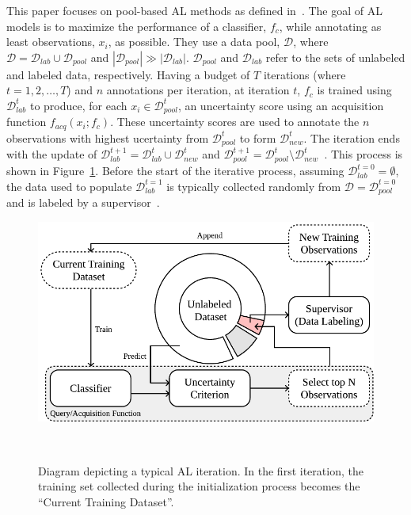 \documentclass[10pt,journal,compsoc]{IEEEtran}
\begin{document}
This paper focuses on pool-based AL methods as defined
in~\cite{katz2021improved}. The goal of AL models is to maximize the
performance of a classifier, $f_{c}$, while annotating as least observations,
$x_i$, as possible. They use a data pool, $\mathcal{D}$, where $\mathcal{D} =
\mathcal{D}_{lab} \cup \mathcal{D}_{pool}$ and $|\mathcal{D}_{pool}| \gg
|\mathcal{D}_{lab}|$. $\mathcal{D}_{pool}$ and $\mathcal{D}_{lab}$ refer to
the sets of unlabeled and labeled data, respectively. Having a budget of $T$
iterations (where $t = 1, 2, \ldots, T$) and $n$ annotations per iteration, at
iteration $t$, $f_c$ is trained using $\mathcal{D}_{lab}^t$ to produce, for
each $x_i \in \mathcal{D}_{pool}^t$, an uncertainty score using an acquisition
function $f_{acq}(x_i;f_c)$. These uncertainty scores are used to annotate the
$n$ observations with highest ucertainty from $\mathcal{D}_{pool}^t$ to form
$\mathcal{D}_{new}^t$. The iteration ends with the update of
$\mathcal{D}_{lab}^{t+1} = \mathcal{D}_{lab}^t \cup \mathcal{D}_{new}^t$ and
$\mathcal{D}_{pool}^{t+1} = \mathcal{D}_{pool}^t \setminus
\mathcal{D}_{new}^t$~\cite{Su2020, Sverchkov2017}. This process is shown in
Figure~\ref{fig:al_iteration}. Before the start of the iterative process,
assuming $\mathcal{D}_{lab}^{t=0} = \emptyset$, the data used to populate
$\mathcal{D}_{lab}^{t=1}$ is typically collected randomly from $\mathcal{D} =
\mathcal{D}_{pool}^{t=0}$ and is labeled by a supervisor~\cite{Fonseca2021,
Yoo2019, Aghdam2019}. 

\begin{figure}
	\centering
	\includegraphics[width=\linewidth]{../analysis/al_iteration}
    \caption{%
        Diagram depicting a typical AL iteration. In the first iteration, the
        training set collected during the initialization process becomes the
        ``Current Training Dataset''.
    }~\label{fig:al_iteration}
\end{figure}
\end{document}
